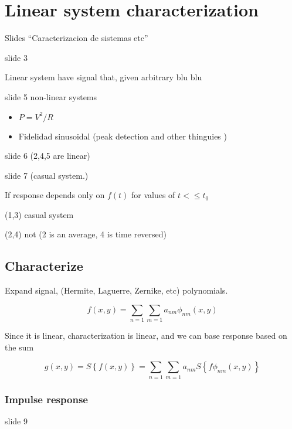 \documentclass[../main/main.tex]{subfiles}
\begin{document}
\section{Linear system characterization}

Slides ``Caracterizacion de sistemas etc''



slide 3

Linear system have signal that, given arbitrary blu blu

slide 5 non-linear systems

\begin{itemize}
	\item $P=V^{2}/R$
	\item Fidelidad sinusoidal (peak detection and other thinguies )

\end{itemize}


slide 6 (2,4,5 are linear)

slide 7 (casual system.)

If response depends only on $f(t)$ for values of $t<\leq t_{0}$

(1,3) casual system

(2,4) not (2 is an average, 4 is time reversed)


\subsection{Characterize}

Expand signal, (Hermite, Laguerre, Zernike, etc) polynomials.

\begin{equation}
	f(x,y) = \sum_{n=1}\sum_{m=1} a_{nm} \phi_{nm}(x,y)
\end{equation}

Since it is linear, characterization is linear, and we can base response based on the sum

\begin{equation}
	g(x,y) = S\left\{f(x,y)\right\} = \sum_{n=1}\sum_{m=1} a_{nm} S\left\{f\phi_{nm}(x,y)\right\}
\end{equation}

\subsubsection{Impulse response}

\newcommand{\hh}{h(x,y,\eta,\phi)}

slide 9
\end{document}
